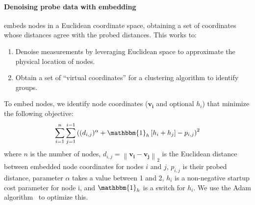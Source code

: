 \paragraph{Denoising probe data with embedding}
\label{sec:embedding}
 \marcopolo embeds nodes in a Euclidean coordinate space, obtaining a set of coordinates whose distances agree with the probed distances. This works to:
\begin{enumerate}[noitemsep,topsep=0pt,parsep=0pt,partopsep=0pt]
    \item Denoise measurements by leveraging Euclidean space to approximate the physical location of nodes. %
    \item Obtain a set of ``virtual coordinates'' for a clustering algorithm to identify groups.
\end{enumerate}
To embed nodes, we identify node coordinates ($\mathbf{v_i}$ and optional $h_i$) that minimize the following objective:
\begin{equation}
    \sum_{i=1}^n \sum_{j=1}^{i-1} \left( (d_{i,j})^\alpha + \mathbbm{1}_h\left[h_i + h_j \right]  - p_{i,j}\right)^2 
\end{equation}
where $n$ is the number of nodes, $d_{i,j} = \left\lVert \mathbf{v_i} - \mathbf{v_j} \right\rVert_2$ is the Euclidean distance between embedded node coordinates for nodes $i$ and $j$, $p_{i,j}$ is their probed distance, parameter $\alpha$ takes a value between 1 and 2, $h_i$ is a non-negative startup cost parameter for node i, and $\mathbbm{1}_h$ is a switch for $h_i$. We use the Adam algorithm~\cite{kingma2014adam} to optimize this.


